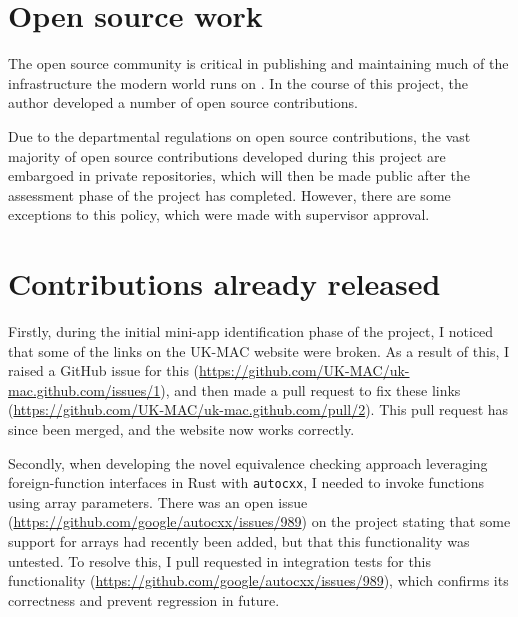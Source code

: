 \section{Open source work}
\label{sec:open-source-work}

The open source community is critical in publishing and maintaining much of the infrastructure the modern world runs on
. In the course of this project, the author developed a number of open source contributions.

Due to the departmental regulations on open source contributions, the vast majority of open source contributions developed during this project are embargoed in private repositories, which will then be made public after the assessment phase of the project has completed. However, there are some exceptions to this policy, which were made with supervisor approval.

\section{Contributions already released}
\label{sec:open-source-already-released}

Firstly, during the initial mini-app identification phase of the project, I noticed that some of the links on the UK-MAC website were broken. As a result of this, I raised a GitHub issue for this (\url{https://github.com/UK-MAC/uk-mac.github.com/issues/1}), and then made a pull request to fix these links (\url{https://github.com/UK-MAC/uk-mac.github.com/pull/2}). This pull request has since been merged, and the website now works correctly.

Secondly, when developing the novel equivalence checking approach leveraging foreign-function interfaces in Rust with \texttt{autocxx}, I needed to invoke functions using array parameters. There was an open issue (\url{https://github.com/google/autocxx/issues/989}) on the project stating that some support for arrays had recently been added, but that this functionality was untested. To resolve this, I pull requested in integration tests for this functionality (\url{https://github.com/google/autocxx/issues/989}), which confirms its correctness and prevent regression in future.


